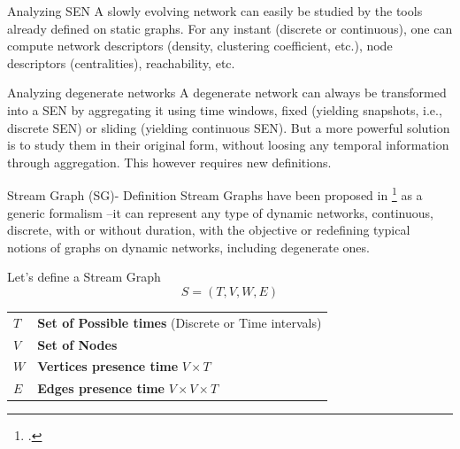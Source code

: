 \documentclass[a4paper,11pt]{book}
\begin{document}
\begin{textbox}{Analyzing SEN}
A slowly evolving network can easily be studied by the tools already defined on static graphs. For any instant (discrete or continuous), one can compute network descriptors (density, clustering coefficient, etc.), node descriptors (centralities), reachability, etc.
\end{textbox}


\begin{textbox}{Analyzing degenerate networks}
A degenerate network can always be transformed into a SEN by aggregating it using time windows, fixed (yielding snapshots, i.e., discrete SEN) or sliding (yielding continuous SEN). But a more powerful solution is to study them in their original form, without loosing any temporal information through aggregation. This however requires new definitions. 
\end{textbox}


\begin{textbox}{Stream Graph (SG)- Definition}
Stream Graphs have been proposed in \footcite{latapy2018stream} as a generic formalism --it can represent any type of dynamic networks, continuous, discrete, with or without duration, with the objective or redefining typical notions of graphs on dynamic networks, including degenerate ones.

Let's define a Stream Graph 
\[S=(T,V,W,E)\]


\begin{tabular}{p{}|p{}}\scriptsize

$T$ & \textbf{Set of Possible times} (Discrete or Time intervals) \\

$V$ & \textbf{Set of Nodes} \\

$W$ & \textbf{Vertices presence time} $V \times T$ \\
$E$ & \textbf{Edges presence time} $V \times V \times T$ \\


\end{tabular}
\end{textbox}
\end{document}

